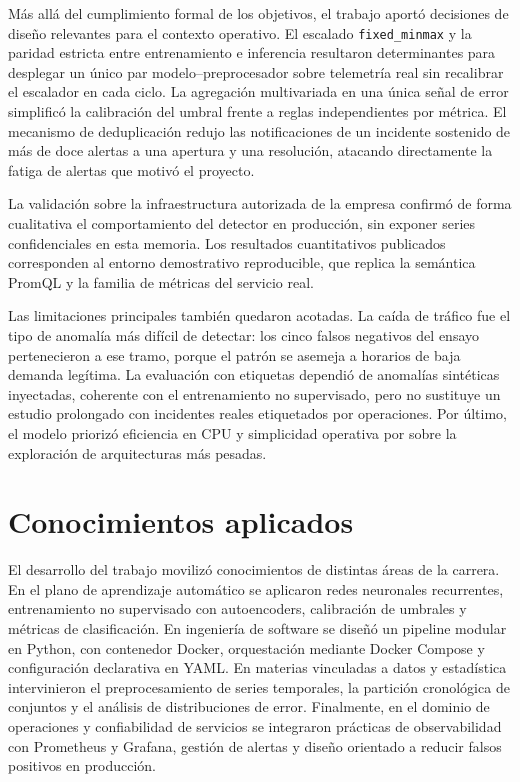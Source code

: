Más allá del cumplimiento formal de los objetivos, el trabajo aportó decisiones de diseño relevantes para el contexto operativo. El escalado \texttt{fixed\_minmax} y la paridad estricta entre entrenamiento e inferencia resultaron determinantes para desplegar un único par modelo--preprocesador sobre telemetría real sin recalibrar el escalador en cada ciclo. La agregación multivariada en una única señal de error simplificó la calibración del umbral frente a reglas independientes por métrica. El mecanismo de deduplicación redujo las notificaciones de un incidente sostenido de más de doce alertas a una apertura y una resolución, atacando directamente la fatiga de alertas que motivó el proyecto.

La validación sobre la infraestructura autorizada de la empresa confirmó de forma cualitativa el comportamiento del detector en producción, sin exponer series confidenciales en esta memoria. Los resultados cuantitativos publicados corresponden al entorno demostrativo reproducible, que replica la semántica PromQL y la familia de métricas del servicio real.

Las limitaciones principales también quedaron acotadas. La caída de tráfico fue el tipo de anomalía más difícil de detectar: los cinco falsos negativos del ensayo pertenecieron a ese tramo, porque el patrón se asemeja a horarios de baja demanda legítima. La evaluación con etiquetas dependió de anomalías sintéticas inyectadas, coherente con el entrenamiento no supervisado, pero no sustituye un estudio prolongado con incidentes reales etiquetados por operaciones. Por último, el modelo priorizó eficiencia en CPU y simplicidad operativa por sobre la exploración de arquitecturas más pesadas.

\section{Conocimientos aplicados}

El desarrollo del trabajo movilizó conocimientos de distintas áreas de la carrera. En el plano de aprendizaje automático se aplicaron redes neuronales recurrentes, entrenamiento no supervisado con autoencoders, calibración de umbrales y métricas de clasificación. En ingeniería de software se diseñó un pipeline modular en Python, con contenedor Docker, orquestación mediante Docker Compose y configuración declarativa en YAML. En materias vinculadas a datos y estadística intervinieron el preprocesamiento de series temporales, la partición cronológica de conjuntos y el análisis de distribuciones de error. Finalmente, en el dominio de operaciones y confiabilidad de servicios se integraron prácticas de observabilidad con Prometheus y Grafana, gestión de alertas y diseño orientado a reducir falsos positivos en producción.

